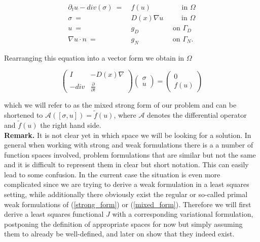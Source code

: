 \documentclass[../draft_1.tex]{subfiles}
\begin{document}
\begin{ceqn}
	\begin{equation}
	\begin{aligned}
	\label{mixed_form}
	 \partial_t u - div(\sigma) \ =& \ f(u) \qquad \qquad \text{ in } \Omega \\
	\sigma \ =& \ D(x)  \nabla u \ \qquad \text{ in } \Omega  \\
	u \ =& \ g_D  \ \ \qquad  \qquad \text{ on } \Gamma_D \\
	\nabla u \cdot n \ =& \ g_N  \ \ \qquad \qquad \text{ on } \Gamma_N.
	\end{aligned}
	\end{equation}
\end{ceqn}
Rearranging this equation into a vector form we obtain in $\Omega$
\begin{ceqn}
	\begin{equation}
	\begin{pmatrix}
	I & - D(x) \nabla \\
	- div & \frac{\partial}{\partial t} 
	\end{pmatrix}
	\begin{pmatrix}
	\sigma \\
	u
	\end{pmatrix} = 
	\begin{pmatrix}
	0 \\
	f(u)
	\end{pmatrix}
	\end{equation}
\end{ceqn}
which we will refer to as the mixed strong form of our problem and can be shortened to $\mathcal{A} ([\sigma, u]) = \tilde{f}(u)$, where $\mathcal{A}$ denotes the differential operator and $\tilde{f}(u)$ the right hand side. 
\smallskip
\\
\textbf{Remark.} It is not clear yet in which space we will be looking for a solution. In general when working with strong and weak formulations there is a a number of function spaces involved, problem formulations that are similar but not the same and it is difficult to represent them in clear but short notation. This can easily lead to some confusion. In the current case the situation is even more complicated since we are trying to derive a weak formulation in a least squares setting, while additionally there obviously exist the regular or so-called primal weak formulations of (\ref{strong_form}) or (\ref{mixed_form}). Therefore we will first derive a least squares functional $J$ with a corresponding variational formulation, postponing the definition of appropriate spaces for now but simply assuming them to already be well-defined, and later on show that they indeed exist.
\end{document}
